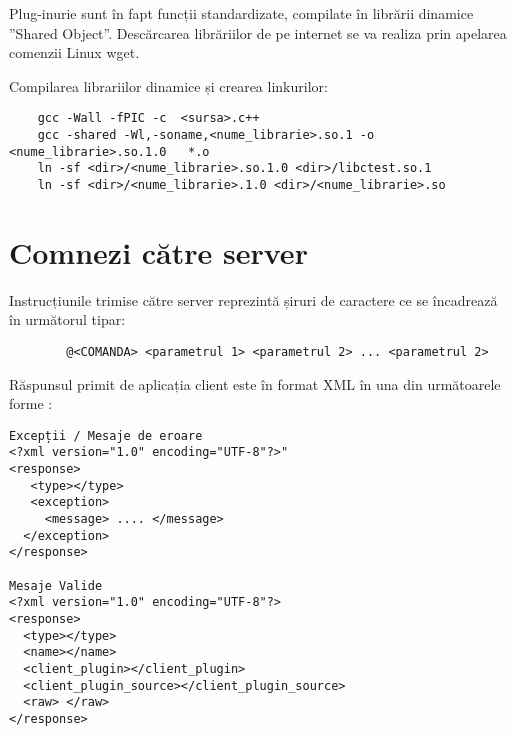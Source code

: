\par Plug-inurie sunt în fapt funcții standardizate, compilate în librării dinamice ”Shared Object”. Descărcarea librăriilor de pe internet se va realiza prin apelarea comenzii Linux wget. 
\par Compilarea librariilor dinamice și crearea linkurilor:
\begin{verbatim}
    gcc -Wall -fPIC -c  <sursa>.c++ 
    gcc -shared -Wl,-soname,<nume_librarie>.so.1 -o <nume_librarie>.so.1.0   *.o 
    ln -sf <dir>/<nume_librarie>.so.1.0 <dir>/libctest.so.1 
    ln -sf <dir>/<nume_librarie>.1.0 <dir>/<nume_librarie>.so 	
\end{verbatim}

\section{Comnezi către server}

\par Instrucțiunile trimise către server reprezintă șiruri de caractere ce se încadrează în următorul tipar:
 
\begin{verbatim}
        @<COMANDA> <parametrul 1> <parametrul 2> ... <parametrul 2>
\end{verbatim} 
Răspunsul primit de aplicația client este în format XML în una din următoarele forme :

\begin{verbatim}
Excepții / Mesaje de eroare
<?xml version="1.0" encoding="UTF-8"?>"
<response>
   <type></type>
   <exception>
     <message> .... </message>
  </exception>
</response>

Mesaje Valide
<?xml version="1.0" encoding="UTF-8"?>
<response>
  <type></type>
  <name></name>
  <client_plugin></client_plugin>
  <client_plugin_source></client_plugin_source>
  <raw> </raw>
</response>
\end{verbatim}

